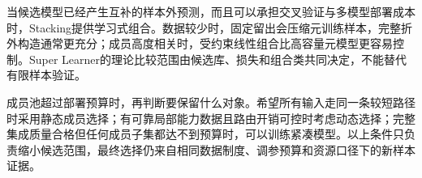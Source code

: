 当候选模型已经产生互补的样本外预测，而且可以承担交叉验证与多模型部署成本时，Stacking提供学习式组合。数据较少时，固定留出会压缩元训练样本，完整折外构造通常更充分；成员高度相关时，受约束线性组合比高容量元模型更容易控制。Super Learner的理论比较范围由候选库、损失和组合类共同决定，不能替代有限样本验证。

成员池超过部署预算时，再判断要保留什么对象。希望所有输入走同一条较短路径时采用静态成员选择；有可靠局部能力数据且路由开销可控时考虑动态选择；完整集成质量合格但任何成员子集都达不到预算时，可以训练紧凑模型。以上条件只负责缩小候选范围，最终选择仍来自相同数据制度、调参预算和资源口径下的新样本证据。
